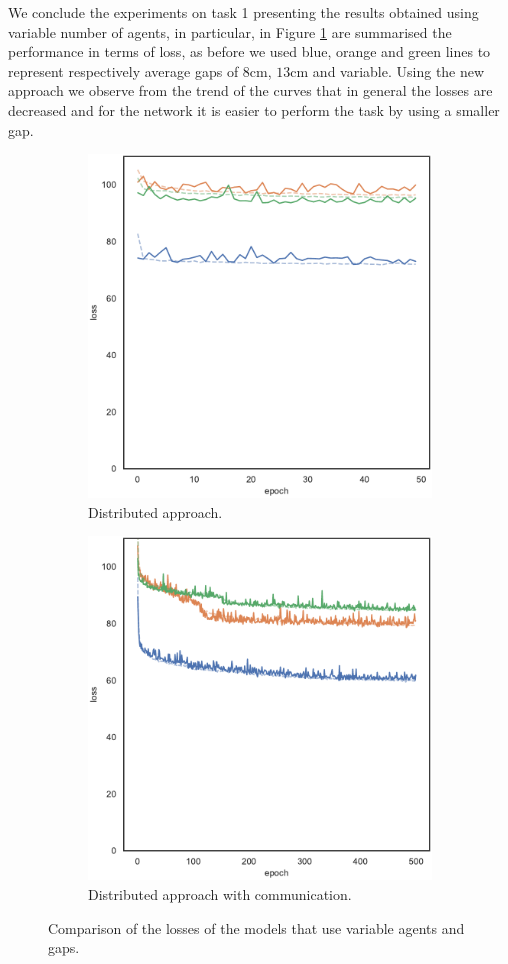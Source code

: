 We conclude the experiments on task 1 presenting the results obtained using 
variable number of agents, in particular, in Figure \ref{fig:commlossNvar} are 
summarised the performance in terms of loss, as before we used blue, orange and 
green lines to represent respectively average gaps of $8$\gls{cm}, $13$\gls{cm} 
and variable.
Using the new approach we observe from the trend of the curves that in general 
the losses are decreased and for the network it is easier to perform the task by 
using a smaller gap.
\begin{figure}[!htb]
	\begin{center}
		\begin{subfigure}[h]{0.49\textwidth}
			\centering
			\includegraphics[width=.7\textwidth]{contents/images/task1-comm-extension/loss-distributed-Nvar@copy}
			\caption{Distributed approach.}
		\end{subfigure}
		\hfill
		\begin{subfigure}[h]{0.49\textwidth}
			\centering
			\includegraphics[width=.7\textwidth]{contents/images/task1-comm-extension/loss-communication-Nvar@copy}
			\caption{Distributed approach with communication.}
		\end{subfigure}	
	\end{center}
	\vspace{-0.5cm}
	\caption{Comparison of the losses of the models that use variable agents and 	
		gaps.}
	\label{fig:commlossNvar}
\end{figure}

